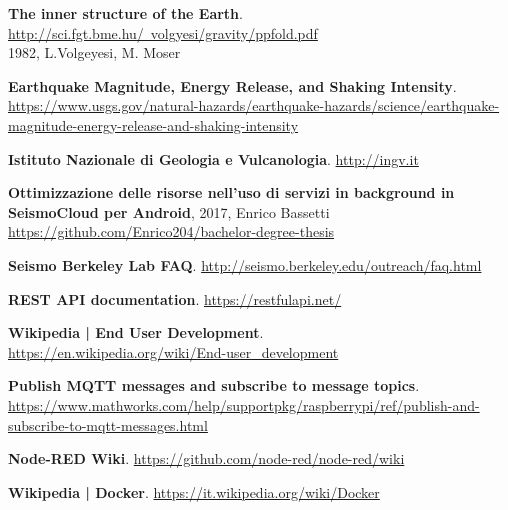\documentclass[a4paper,10pt]{memoir}
\begin{document}
\begin{thebibliography}{9}

  \textbf{The inner structure of the Earth}.\\
  \href{http://sci.fgt.bme.hu/~volgyesi/gravity/ppfold.pdf}{http://sci.fgt.bme.hu/~volgyesi/gravity/ppfold.pdf}\\
  1982, L.Volgeyesi, M. Moser

  \textbf{Earthquake Magnitude, Energy Release, and Shaking Intensity}.\\
  \href{https://www.usgs.gov/natural-hazards/earthquake-hazards/science/earthquake-magnitude-energy-release-and-shaking-intensity}{https://www.usgs.gov/natural-hazards/earthquake-hazards/science/earthquake-magnitude-energy-release-and-shaking-intensity}

  \textbf{Istituto Nazionale di Geologia e Vulcanologia}.
  \href{http://ingv.it}{http://ingv.it}

  \textbf{Ottimizzazione delle risorse nell’uso di servizi in background in SeismoCloud per Android}, 2017, Enrico Bassetti 
  \href{https://github.com/Enrico204/bachelor-degree-thesis}{https://github.com/Enrico204/bachelor-degree-thesis}

  \textbf{Seismo Berkeley Lab FAQ}.
  \href{http://seismo.berkeley.edu/outreach/faq.html}{http://seismo.berkeley.edu/outreach/faq.html}

  \textbf{REST API documentation}.
  \href{https://restfulapi.net/}{https://restfulapi.net/}

  \textbf{Wikipedia | End User Development}.\\
  \href{https://en.wikipedia.org/wiki/End-user_development}{https://en.wikipedia.org/wiki/End-user\_development}

  \textbf{Publish MQTT messages and subscribe to message topics}.\\
  \href{https://www.mathworks.com/help/supportpkg/raspberrypi/ref/publish-and-subscribe-to-mqtt-messages.html}{https://www.mathworks.com/help/supportpkg/raspberrypi/ref/publish-and-subscribe-to-mqtt-messages.html}

  \textbf{Node-RED Wiki}.
  \href{https://github.com/node-red/node-red/wiki}{https://github.com/node-red/node-red/wiki}

  \textbf{Wikipedia | Docker}.
  \href{https://it.wikipedia.org/wiki/Docker/}{https://it.wikipedia.org/wiki/Docker}


\end{thebibliography}
\end{document}

